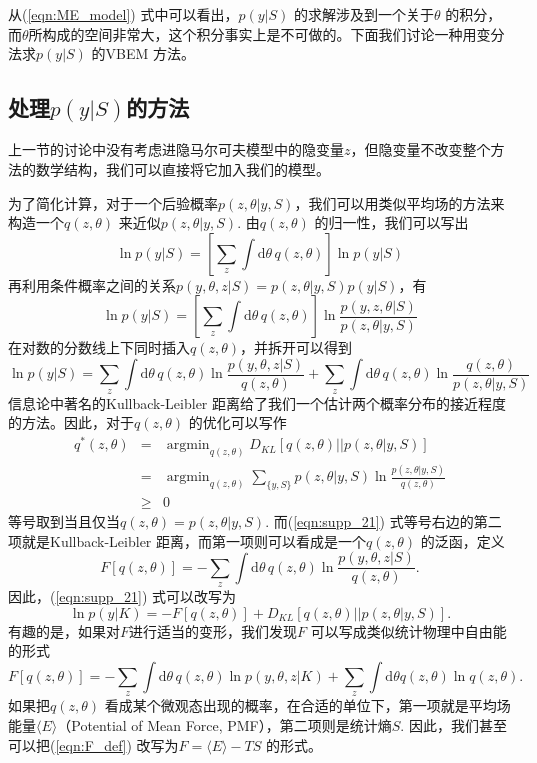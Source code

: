 \documentclass[11pt, a4paper]{article}
\DeclareMathOperator*{\argmin}{argmin}
\begin{document}
    从(\ref{eqn:ME_model}) 式中可以看出，$p(y|S)$ 的求解涉及到一个关于$\theta$ 的积分，而$\theta$所构成的空间非常大，这个积分事实上是不可做的。下面我们讨论一种用变分法求$p(y|S)$ 的VBEM 方法。

    \subsection{处理$p(y|S)$的方法}
    上一节的讨论中没有考虑进隐马尔可夫模型中的隐变量$z$，但隐变量不改变整个方法的数学结构，我们可以直接将它加入我们的模型。

    为了简化计算，对于一个后验概率$p(z,\theta|y, S)$，我们可以用类似平均场的方法来构造一个$q(z,\theta)$ 来近似$p(z,\theta|y, S)$. 由$q(z,\theta)$ 的归一性，我们可以写出
    $$\ln p(y|S) = \left[\sum_z\int \mathrm d\theta\, q(z,\theta)\right]\ln p(y|S)$$
    再利用条件概率之间的关系$p(y,\theta,z|S) = p(z,\theta|y, S)p(y|S)$，有
    $$\ln p(y|S) = \left[\sum_z\int \mathrm d\theta\, q(z,\theta)\right]\ln \frac{p(y,z,\theta|S)}{p(z,\theta|y,S)}$$
    在对数的分数线上下同时插入$q(z,\theta)$，并拆开可以得到
    \begin{equation}\label{eqn:supp_21}
      \ln p(y|S) = \sum_z\int \mathrm d\theta\, q(z,\theta)\ln\frac{p(y,\theta,z|S)}{q(z,\theta)}+\sum_z\int \mathrm d\theta\, q(z,\theta)\ln\frac{q(z,\theta)}{p(z,\theta|y,S)}
    \end{equation}
    信息论中著名的Kullback-Leibler 距离给了我们一个估计两个概率分布的接近程度的方法。因此，对于$q(z,\theta)$ 的优化可以写作
    \begin{eqnarray*}
      q^*(z,\theta) &=& \argmin_{q(z,\theta)} D_{KL}[q(z,\theta) || p(z,\theta|y,S)] \\
                    &=& \argmin_{q(z,\theta)}\sum_{\{y,S\}} p(z,\theta|y,S)\ln\frac{p(z,\theta|y,S)}{q(z,\theta)}\\
                    &\ge& 0
    \end{eqnarray*}
    等号取到当且仅当$q(z,\theta) = p(z,\theta|y, S)$. 而(\ref{eqn:supp_21}) 式等号右边的第二项就是Kullback-Leibler 距离，而第一项则可以看成是一个$q(z,\theta)$ 的泛函，定义
    \begin{equation}\label{eqn:F_def}
      F[q(z,\theta)] = -\sum_z\int \mathrm d\theta\, q(z,\theta)\ln\frac{p(y,\theta,z|S)}{q(z,\theta)}.
    \end{equation}
    因此，(\ref{eqn:supp_21}) 式可以改写为
    \begin{equation}\label{eqn:supp_24}
      \ln p(y|K)= -F[q(z,\theta)] +D_{KL}[q(z,\theta)||p(z,\theta| y, S)].
    \end{equation}
    有趣的是，如果对$F$进行适当的变形，我们发现$F$ 可以写成类似统计物理中自由能的形式
    $$F[q(z,\theta)] = -\sum_z\int \mathrm d\theta\, q(z,\theta)\ln p(y,\theta,z|K) + \sum_z\int \mathrm d\theta q(z,\theta)\ln q(z,\theta).$$
    如果把$q(z,\theta)$ 看成某个微观态出现的概率，在合适的单位下，第一项就是平均场能量$\langle E\rangle$（Potential of Mean Force, PMF），第二项则是统计熵$S$. 因此，我们甚至可以把(\ref{eqn:F_def}) 改写为$F=\langle E\rangle -TS$ 的形式。
\end{document}
